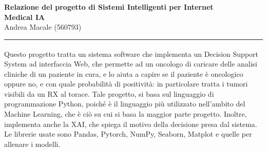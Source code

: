 \documentclass[10pt,a4paper]{article}
\begin{document}
    \thispagestyle{plain}
    \begin{center}
        {\fontsize{18}{25}\selectfont \textbf{Relazione del progetto di Sistemi Intelligenti per Internet} \\ 
            \textbf{Medical IA} \\ [4mm]
            Andrea Macale (560793)} 
        \vspace{4mm}
        \rule{\textwidth}{1.5pt} 
        \vspace{6mm}
    \end{center}

    \noindent Questo progetto\textsuperscript{\cite{progetto}} tratta un sistema software che implementa un Decision Support System ad interfaccia Web, che
    permette ad un oncologo di caricare delle analisi cliniche di un paziente in cura, e lo aiuta a capire se il
    paziente è oncologico oppure no, e con quale probabilità di positività: in particolare tratta i tumori visibili da un RX al torace. Tale progetto, si basa sul linguaggio di programmazione
    Python, poiché è il linguaggio più utilizzato nell'ambito del Machine Learning, che è ciò su cui si basa la maggior
    parte progetto. Inoltre, implementa anche la XAI, che spiega il motivo della decisione presa dal sistema. Le librerie
    usate sono Pandas, Pytorch, NumPy, Seaborn, Matplot e quelle per allenare i modelli.
\end{document}

